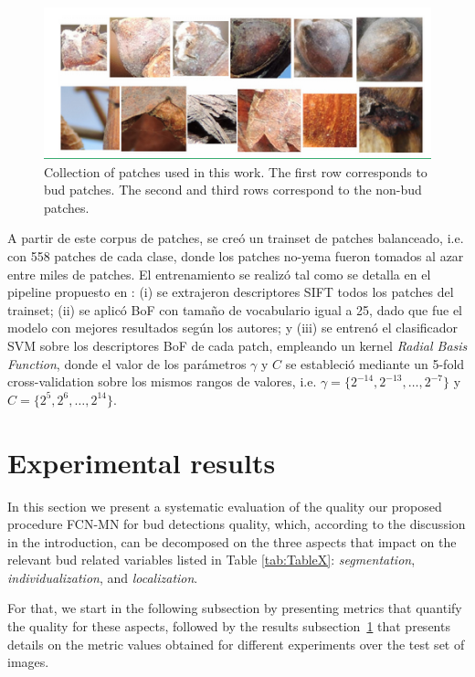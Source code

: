 \documentclass[a4paper,authoryear,review]{elsarticle}
\begin{document}
\begin{figure}
	\centering
	\includegraphics[width=12cm]{figures/Figure2.png}
	\caption{Collection of patches used in this work. The first row corresponds to bud patches. The second and third rows correspond to the non-bud patches.}
	\label{fig:Figure2}
\end{figure}

A partir de este corpus de patches, se creó un trainset de patches balanceado, i.e. con 558 patches de cada clase, donde los patches no-yema fueron tomados al azar entre miles de patches. El entrenamiento se realizó tal como se detalla en el pipeline propuesto en \citet{perez2017image}: (i) se extrajeron descriptores SIFT todos los patches del trainset; (ii) se aplicó BoF con tamaño de vocabulario igual a 25, dado que fue el modelo con mejores resultados según los autores; y (iii) se entrenó el clasificador SVM sobre los descriptores BoF de cada patch, empleando un kernel \emph{Radial Basis Function}, donde el valor de los parámetros $\gamma$ y $C$ se estableció mediante un 5-fold cross-validation sobre los mismos rangos de valores, i.e. $\gamma = \{2^{-14}, 2^{-13}, \ldots, 2^{-7}\}$ y $C = \{2^{5}, 2^{6},\ldots , 2^{14}\}$.


\section{Experimental results} \label{sec:results}

In this section we present a systematic evaluation of the quality our proposed procedure FCN-MN for bud detections quality, which, 
%
according to the discussion in the introduction, can be decomposed on the three aspects that impact on the relevant bud related variables listed in Table \ref{tab:TableX}: \emph{segmentation}, \emph{individualization}, and \emph{localization}. 

%
For that, we start in the following subsection by presenting metrics that quantify the quality for these aspects, followed by the results   subsection~\ref{sec:results} that presents details on the metric values obtained for different experiments over the test set of images. 
\end{document}
